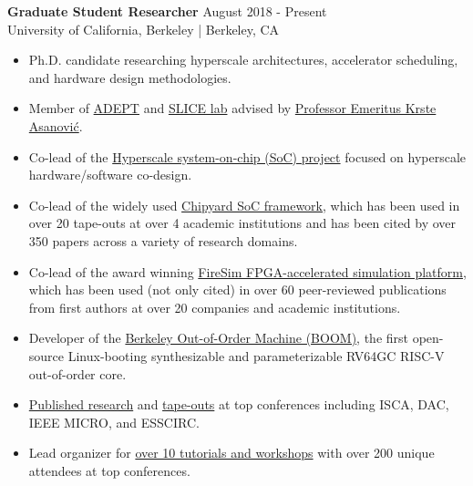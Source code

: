\documentclass[line]{res}
\begin{document}
\begin{resume}
\textbf{Graduate Student Researcher} \hfill August 2018 - Present
\\
University of California, Berkeley | Berkeley, CA
\\
\vspace{-3mm}
\begin{itemize}
\item Ph.D. candidate researching hyperscale architectures, accelerator scheduling, and hardware design methodologies.
\item Member of \href{https://adept.eecs.berkeley.edu/}{ADEPT} and \href{https://slice.eecs.berkeley.edu/}{SLICE lab} advised by \href{https://people.eecs.berkeley.edu/~krste/}{Professor Emeritus Krste Asanovi\'c}.
\item Co-lead of the \hyperref[sec:hyperscale-soc]{Hyperscale system-on-chip (SoC) project} focused on hyperscale hardware/software co-design.
\item Co-lead of the widely used \hyperref[sec:chipyard]{Chipyard SoC framework}, which has been used in over 20 tape-outs at over 4 academic institutions and has been cited by over 350 papers across a variety of research domains.
\item Co-lead of the award winning \hyperref[sec:firesim]{FireSim FPGA-accelerated simulation platform}, which has been used (not only cited) in over 60 peer-reviewed publications from first authors at over 20 companies and academic institutions.
\item Developer of the \hyperref[sec:boom]{Berkeley Out-of-Order Machine (BOOM)}, the first open-source Linux-booting synthesizable and parameterizable RV64GC RISC-V out-of-order core.
\item \hyperref[sec:pubs]{Published research} and \hyperref[sec:beagle]{tape-outs} at top conferences including ISCA, DAC, IEEE MICRO, and ESSCIRC.
\item Lead organizer for \hyperref[sec:tutorialsworkshops]{over 10 tutorials and workshops} with over 200 unique attendees at top conferences.
\end{itemize}


\end{resume}
\end{document}
